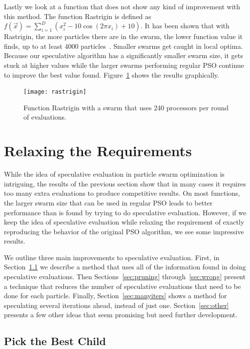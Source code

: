 \documentclass[journal,letterpaper]{IEEEtran}
\renewcommand{\sec}[1]{Section~\ref{sec:#1}}
\newcommand{\fig}[1]{Figure~\ref{fig:#1}}
\begin{document}
Lastly we look at a function that does not show any kind of improvement with
this method.  The function Rastrigin is defined as $f(\Vec{x}) = \sum_{i=1}^D
\left(x_i^2 - 10\cos\left(2\pi x_i\right) + 10\right)$.  It has been shown that
with Rastrigin, the more particles there are in the swarm, the lower function
value it finds, up to at least 4000 particles~\cite{mcnabb-cec09}.  Smaller
swarms get caught in local optima.  Because our speculative algorithm has a
significantly smaller swarm size, it gets stuck at higher values while the
larger swarms performing regular PSO continue to improve the best value found.
\fig{rastrigin} shows the results graphically.

\begin{figure}
  \centering
  \texttt{[image: rastrigin]}
  \caption{Function Rastrigin with a swarm that uses 240 processors per round
  of evaluations.}
  \label{fig:rastrigin}
\end{figure}

\section{Relaxing the Requirements}
\label{sec:relax}

While the idea of speculative evaluation in particle swarm optimization is
intriguing, the results of the previous section show that in many cases it
requires too many extra evaluations to produce competitive results.  On most
functions, the larger swarm size that can be used in regular PSO leads to
better performance than is found by trying to do speculative evaluation.
However, if we keep the idea of speculative evaluation while relaxing the
requirement of exactly reproducing the behavior of the original PSO algorithm,
we see some impressive results.

We outline three main improvements to speculative evaluation.  First, in
\sec{pickbest} we describe a method that uses all of the information found in
doing speculative evaluations.  Then Sections~\ref{sec:pruning}
through~\ref{sec:wrong} present a technique that reduces the number of
speculative evaluations that need to be done for each particle.  Finally,
\sec{manyiters} shows a method for speculating several iterations ahead,
instead of just one.  \sec{other} presents a few other ideas that seem
promising but need further development.

\subsection{Pick the Best Child}
\label{sec:pickbest}
\end{document}
